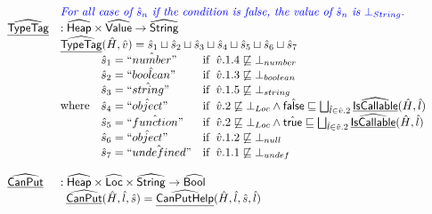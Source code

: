 \documentclass{article}
\newcommand{\SF}[1]{\mbox{\textsf{#1}}}
\newcommand{\wherec}[1]{{\rm where}\begin{array}[t]{l}#1\end{array}}
\newcommand{\ifc}[1]{{\rm if}\begin{array}[t]{l}#1\end{array}}
\newcommand{\abs}[1]{\widehat{\SF{#1}}}
\newcommand{\aHeap}{\abs{Heap}}
\newcommand{\aLoc}{\abs{Loc}}
\newcommand{\aValue}{\abs{Value}}
\newcommand{\ahf}[1]{\widehat{\underline{\sf #1}}}
\newcommand{\atrue}{\hat{\SF{true}}}
\newcommand{\afalse}{\hat{\SF{false}}}
\def\inblue{\color{blue}}
\begin{document}
\[\begin{array}{ll}
& {\inblue \textit{For all case of }\hat{s}_n\textit{ if the condition is false, the value of }\hat{s}_n\textit{ is }\bot_{String}.} \\
\ahf{TypeTag} & : \aHeap \times \aValue \rightarrow \abs{String}\\
& \ahf{TypeTag}(\hat{H},\hat{v}) = \hat{s}_1\sqcup\hat{s}_2\sqcup\hat{s}_3\sqcup\hat{s}_4\sqcup\hat{s}_5\sqcup\hat{s}_6\sqcup\hat{s}_7 \\
& \wherec{
  \begin{array}{ll}
  \hat{s}_1 = \hat{``number"} & \ifc{\hat{v}.1.4\not\sqsubseteq\bot_{number}} \\
  \hat{s}_2 = \hat{``boolean"} & \ifc{\hat{v}.1.3\not\sqsubseteq\bot_{boolean}} \\
  \hat{s}_3 = \hat{``string"} & \ifc{\hat{v}.1.5\not\sqsubseteq\bot_{string}} \\
  \hat{s}_4 = \hat{``object"} & \ifc{\hat{v}.2\not\sqsubseteq\bot_{Loc}\land\afalse\sqsubseteq\bigsqcup_{\hat{l}\in\hat{v}.2}\ahf{IsCallable}(\hat{H},\hat{l})} \\
  \hat{s}_5 = \hat{``function"} & \ifc{\hat{v}.2\not\sqsubseteq\bot_{Loc}\land\atrue\sqsubseteq\bigsqcup_{\hat{l}\in\hat{v}.2}\ahf{IsCallable}(\hat{H},\hat{l})} \\
  \hat{s}_6 = \hat{``object"} & \ifc{\hat{v}.1.2\not\sqsubseteq\bot_{null}} \\
  \hat{s}_7 = \hat{``undefined"} & \ifc{\hat{v}.1.1\not\sqsubseteq\bot_{undef}} \\
  \end{array}\\
  }\\
\\


\ahf{CanPut} & : \aHeap \times \aLoc \times \abs{String} \rightarrow \abs{Bool}\\
&
\begin{array}{ll}
  \ahf{CanPut}(\hat{H},\hat{l},\hat{s}) = \ahf{CanPutHelp}(\hat{H},\hat{l},\hat{s},\hat{l}) & \\
\end{array}
\\\\


\end{array}\]
\end{document}
